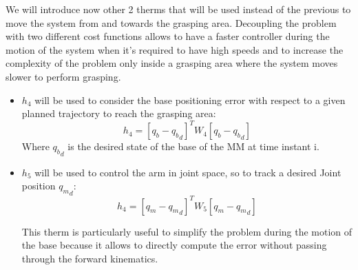 We will introduce now other 2 therms that will be used instead of the previous to move the system from and towards the grasping area. Decoupling the problem with two different cost functions allows to have a faster controller during the motion of the system when it's required to have high speeds and to increase the complexity of the problem only inside a grasping area where the system moves slower to perform grasping. 
\begin{itemize}
    \item $h_4$ will be used to consider the base positioning error with respect to a given planned trajectory to reach the grasping area:
        \begin{equation}
            h_4=[q_b-{q_b}_d]^T W_4 [q_b-{q_b}_d]
        \end{equation}
        Where ${q_b}_d$ is the desired state of the base of the MM at time instant i. \\
    \item $h_5$ will be used to control the arm in joint space, so to track a desired Joint position ${q_m}_d$:
    \begin{equation}
       h_4=[q_m-{q_m}_d]^T W_5 [q_m-{q_m}_d]
    \end{equation}
     
    This therm is particularly useful to simplify the problem during the motion of the base because it allows to directly compute the error without passing through the forward kinematics.
\end{itemize}






